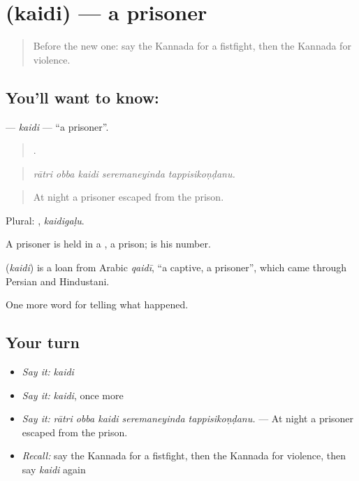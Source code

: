\section[\texorpdfstring{\kn{ಕೈದಿ} (kaidi)}{ಕೈದಿ (kaidi)}]{ (kaidi) — a prisoner}

\label{lesson:KA-C365-kaidi}



\begin{quote}
Before the new one: say the Kannada for a fistfight, then the Kannada for violence.
\end{quote}

\subsection*{You'll want to know: }
\textbf{} — \emph{kaidi} — \textquotedblleft{}a prisoner\textquotedblright{}.

\begin{quote}
    .
\end{quote}

\begin{quote}
\emph{rātri obba kaidi seremaneyinda tappisikoṇḍanu.}
\end{quote}

\begin{quote}
At night a prisoner escaped from the prison.
\end{quote}

Plural: , \emph{kaidigaḷu}.

A prisoner is held in a , a prison;   is his number.

\begin{cousinweb}
\textbf{} (\emph{kaidi}) is a loan from Arabic \emph{qaidī}, \textquotedblleft{}a captive, a prisoner\textquotedblright{}, which came through Persian and Hindustani.
\end{cousinweb}

\begin{grammarlens}[title={What you've built}]
One more word for telling what happened.
\end{grammarlens}

\subsection*{Your turn}
\begin{itemize}
\raggedright
  \item \emph{Say it:} \emph{kaidi}
  \item \emph{Say it:} \emph{kaidi}, once more
  \item \emph{Say it:} \emph{rātri obba kaidi seremaneyinda tappisikoṇḍanu.} — At night a prisoner escaped from the prison.
  \item \emph{Recall:} say the Kannada for a fistfight, then the Kannada for violence, then say \emph{kaidi} again
\end{itemize}

